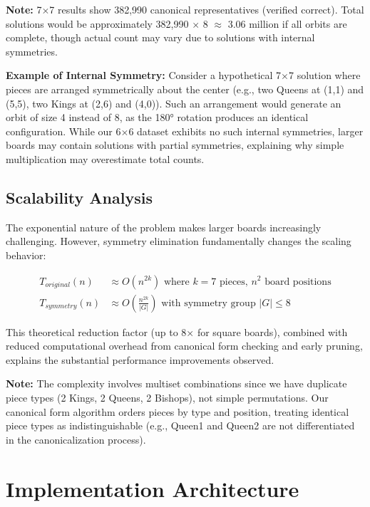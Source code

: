 \documentclass[12pt,a4paper]{article}
\theoremstyle{definition}
\begin{document}
\textbf{Note:} 7$\times$7 results show 382,990 canonical representatives (verified correct). Total solutions would be approximately 382,990 $\times$ 8 $\approx$ 3.06 million if all orbits are complete, though actual count may vary due to solutions with internal symmetries.

\textbf{Example of Internal Symmetry:} Consider a hypothetical 7$\times$7 solution where pieces are arranged symmetrically about the center (e.g., two Queens at (1,1) and (5,5), two Kings at (2,6) and (4,0)). Such an arrangement would generate an orbit of size 4 instead of 8, as the 180° rotation produces an identical configuration. While our 6$\times$6 dataset exhibits no such internal symmetries, larger boards may contain solutions with partial symmetries, explaining why simple multiplication may overestimate total counts.

\subsection{Scalability Analysis}

The exponential nature of the problem makes larger boards increasingly challenging. However, symmetry elimination fundamentally changes the scaling behavior:

\begin{align}
T_{original}(n) &\approx O(n^{2k}) \text{ where } k = 7 \text{ pieces, } n^2 \text{ board positions} \\
T_{symmetry}(n) &\approx O\left(\frac{n^{2k}}{|G|}\right) \text{ with symmetry group } |G| \leq 8
\end{align}

This theoretical reduction factor (up to 8× for square boards), combined with reduced computational overhead from canonical form checking and early pruning, explains the substantial performance improvements observed.

\textbf{Note:} The complexity involves multiset combinations since we have duplicate piece types (2 Kings, 2 Queens, 2 Bishops), not simple permutations. Our canonical form algorithm orders pieces by type and position, treating identical piece types as indistinguishable (e.g., Queen1 and Queen2 are not differentiated in the canonicalization process).

\section{Implementation Architecture}
\end{document}

